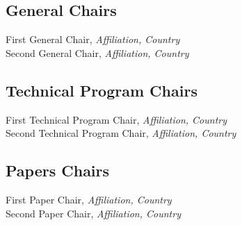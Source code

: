 
\subsection{General Chairs}
First General Chair, \emph{Affiliation, Country}\\
Second General Chair, \emph{Affiliation, Country}


\subsection{Technical Program Chairs}
First Technical Program Chair, \emph{Affiliation, Country}\\
Second Technical Program Chair, \emph{Affiliation, Country}


\subsection{Papers Chairs}
First Paper Chair, \emph{Affiliation, Country}\\
Second Paper Chair, \emph{Affiliation, Country}



